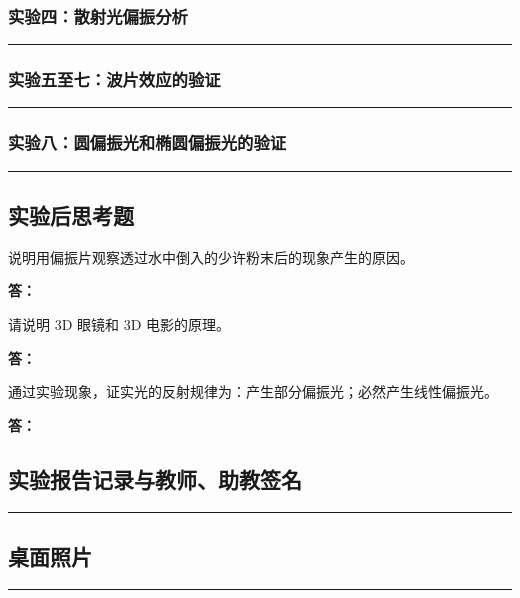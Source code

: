 \documentclass[dvipsnames, svgnames,a4paper,11pt]{article}
\newcommand{\answerblank}[1][3.8cm]{%
  \par\nopagebreak[4]\noindent\textbf{答：}\par\nopagebreak[4]\vspace*{#1}}
\newcommand{\recordblank}[1]{%
  \par\noindent\rule{0.95\linewidth}{0pt}\rule{0pt}{#1}\par}
\begin{document}
\subsubsection{实验四：散射光偏振分析}
\recordblank{3.2cm}
\subsubsection{实验五至七：波片效应的验证}
\recordblank{3.2cm}
\subsubsection{实验八：圆偏振光和椭圆偏振光的验证}
\recordblank{3.2cm}
\subsection{实验后思考题}
\begin{question}
说明用偏振片观察透过水中倒入的少许粉末后的现象产生的原因。
\end{question}
\answerblank[3.8cm]

\begin{question}
请说明 3D 眼镜和 3D 电影的原理。
\end{question}
\answerblank[3.8cm]




\begin{question}
通过实验现象，证实光的反射规律为：产生部分偏振光；必然产生线性偏振光。
\end{question}
\answerblank[3.8cm]

\clearpage
\appendix
\appendixpage
\addappheadtotoc
\subsection{实验报告记录与教师、助教签名}
\recordblank{5.5cm}
\subsection{桌面照片}
\recordblank{5.5cm}
\end{document}
